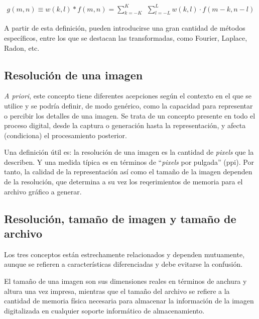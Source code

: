 \begin{eqnarray}
	g(m, n) \equiv w(k, l) \ast f(m, n) = \sum _{k=-K}^{K} \, \; \sum _{l=-L}^{L} w(k, l) \cdot f(m-k, n-l)
\label{EqXXIV}
\end{eqnarray}

A partir de esta definici\'on, pueden introducirse una gran cantidad de m\'etodos espec\'ificos, entre los que se destacan las transformadas, como Fourier,
Laplace, Radon, etc.


\subsection{Resoluci\'on de una imagen}
%
\textit{A priori}, este concepto tiene diferentes acepciones seg\'un el contexto en el que se utilice y se podr\'ia definir, de modo gen\'erico, como
la capacidad para representar o percibir los detalles de una imagen.
%
Se trata de un concepto presente en todo el proceso digital, desde la captura o generaci\'on hasta la representaci\'on, y afecta (condiciona) el
procesamiento posterior.
%

%
Una definici\'on \'util es: la resoluci\'on de una imagen es la cantidad de \textit{pixels} que la describen.
%
Y una medida t\'ipica es en t\'erminos de ``\textit{pixels} por pulgada'' (ppi).
%
Por tanto, la calidad de la representaci\'on as\'i como el tama\~no de la imagen dependen de la resoluci\'on, que determina a su vez los reqerimientos
de memoria para el archivo gr\'afico a generar.


\subsection{Resoluci\'on, tama\~no de imagen y tama\~no de archivo}

Los tres conceptos est\'an estrechamente relacionados y dependen mutuamente, aunque se refieren a caracter\'isticas diferenciadas y debe evitarse
la confusi\'on.
%

%
El tama\~no de una imagen son sus dimensiones reales en t\'erminos de anchura y altura una vez impresa, mientras que el tama\~no del archivo se refiere a la
cantidad de memoria f\'isica necesaria para almacenar la informaci\'on de la imagen digitalizada en cualquier soporte inform\'atico de almacenamiento.
%

